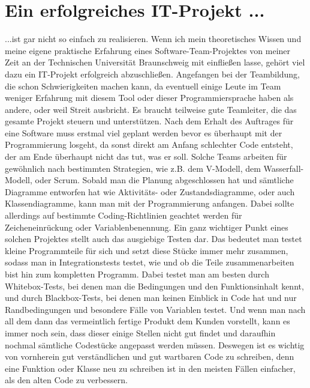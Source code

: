\documentclass[12pt]{scrartcl}
\begin{document}
\newpage

\section{Ein erfolgreiches IT-Projekt ...}

...ist gar nicht so einfach zu realisieren. Wenn ich mein theoretisches Wissen und meine eigene praktische Erfahrung eines Software-Team-Projektes von meiner Zeit an der Technischen Universität Braunschweig mit einfließen lasse, gehört viel dazu ein IT-Projekt erfolgreich abzuschließen.
\newline
\newline
Angefangen bei der Teambildung, die schon Schwierigkeiten machen kann, da eventuell einige Leute im Team weniger Erfahrung mit diesem Tool oder dieser Programmiersprache haben als andere, oder weil Streit ausbricht. Es braucht teilweise gute Teamleiter, die das gesamte Projekt steuern und unterstützen.
\newline
Nach dem Erhalt des Auftrages für eine Software muss erstmal viel geplant werden bevor es überhaupt mit der Programmierung losgeht, da sonst direkt am Anfang schlechter Code entsteht, der am Ende überhaupt nicht das tut, was er soll. Solche Teams arbeiten für gewöhnlich nach bestimmten Strategien, wie z.B. dem V-Modell, dem Wasserfall-Modell, oder Scrum. Sobald man die Planung abgeschlossen hat und sämtliche Diagramme entworfen hat wie Aktivitäts- oder Zustandsdiagramme, oder auch Klassendiagramme, kann man mit der Programmierung anfangen. Dabei sollte allerdings auf bestimmte Coding-Richtlinien geachtet werden für Zeicheneinrückung oder Variablenbenennung.
\newline
\newline
Ein ganz wichtiger Punkt eines solchen Projektes stellt auch das ausgiebige Testen dar. Das bedeutet man testet kleine Programmteile für sich und setzt diese Stücke immer mehr zusammen, sodass man in Integrationstests testet, wie und ob die Teile zusammenarbeiten bist hin zum kompletten Programm. Dabei testet man am besten durch Whitebox-Tests, bei denen man die Bedingungen und den Funktionsinhalt kennt, und durch Blackbox-Tests, bei denen man keinen Einblick in Code hat und nur Randbedingungen und besondere Fälle von Variablen testet.
\newline
\newline
Und wenn man nach all dem dann das vermeintlich fertige Produkt dem Kunden vorstellt, kann es immer noch sein, dass dieser einige Stellen nicht gut findet und daraufhin nochmal sämtliche Codestücke angepasst werden müssen. Deswegen ist es wichtig von vornherein gut verständlichen und gut wartbaren Code zu schreiben, denn eine Funktion oder Klasse neu zu schreiben ist in den meisten Fällen einfacher, als den alten Code zu verbessern.
\end{document}
